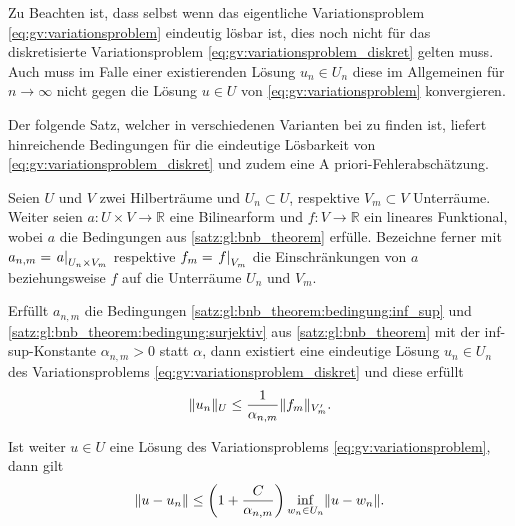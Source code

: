 Zu Beachten ist, dass selbst wenn das eigentliche Variationsproblem \cref{eq:gv:variationsproblem} eindeutig lösbar ist, dies noch nicht für das diskretisierte Variationsproblem \cref{eq:gv:variationsproblem_diskret} gelten muss.
Auch muss im Falle einer existierenden Lösung $u_{n} \in U_{n}$ diese im Allgemeinen für $n \to \infty$ nicht gegen die Lösung $u \in U$ von \cref{eq:gv:variationsproblem} konvergieren.

Der folgende Satz, welcher in verschiedenen Varianten bei \cites[Theorem 6.2.1]{Aziz:2014wf}[Theorem 5.3.1]{Quarteroni:2009hp}[Lemma III.3.7]{Braess:2007wm} zu finden ist, liefert hinreichende Bedingungen für die eindeutige Lösbarkeit von \cref{eq:gv:variationsproblem_diskret} und zudem eine A priori-Fehlerabschätzung.

\begin{Satz}
    Seien $U$ und $V$ zwei Hilberträume und $U_{n} \subset U$, respektive $V_{m} \subset V$ Unterräume.
    Weiter seien $a \colon U \times V \to \mathbb{R}$ eine Bilinearform und $f \colon V \to \mathbb{R}$ ein lineares Funktional, wobei $a$ die Bedingungen aus \cref{satz:gl:bnb_theorem} erfülle.
    Bezeichne ferner mit $a_{n, m} = \left.a\right|_{U_{n} \times V_{m}}$ respektive $f_{m} = \left.f\right|_{V_{m}}$ die Einschränkungen von $a$ beziehungsweise $f$ auf die Unterräume $U_{n}$ und $V_{m}$.

    Erfüllt $a_{n, m}$ die Bedingungen \ref{satz:gl:bnb_theorem:bedingung:inf_sup} und \ref{satz:gl:bnb_theorem:bedingung:surjektiv} aus \cref{satz:gl:bnb_theorem} mit der inf-sup-Konstante $\alpha_{n, m} > 0$ statt $\alpha$, dann existiert eine eindeutige Lösung $u_{n} \in U_{n}$ des Variationsproblems \cref{eq:gv:variationsproblem_diskret} und diese erfüllt
    \begin{equation}
        \lVert u_{n}\rVert_{U} \leq \frac{1}{\alpha_{n, m}} \lVert f_{m}\rVert_{V_m'}.
    \end{equation}

    Ist weiter $u \in U$ eine Lösung des Variationsproblems \cref{eq:gv:variationsproblem}, dann gilt
    \begin{equation}
        \lVert u - u_{n}\rVert \leq \left( 1 + \frac{C}{\alpha_{n, m}} \right)  \inf_{w_{n} \in U_{n}} \lVert u - w_{n}\rVert.
    \end{equation}

    \begin{Beweis}$\;$
    \end{Beweis}
\end{Satz}


